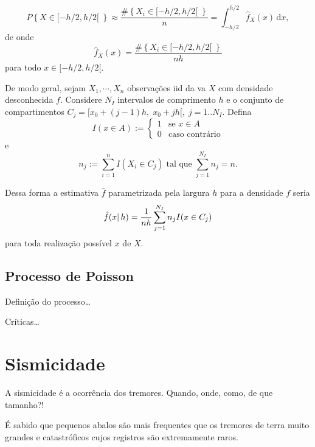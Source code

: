 \begin{equation}
	P \left\{ X \in [-h/2,h/2[ \; \right\} \approx \frac{\# \left\{ X_i \in [-h/2,h/2[ \; \right\}}{n} =
	\int_{-h/2}^{h/2}\!\hat{f}_X(x)\,\mathrm{d}x ,
	\label{eq:hist02}
\end{equation}
de onde 
\begin{equation}
	\hat{f}_X(x) = \frac{\# \left\{ X_i \in [-h/2,h/2[ \; \right\}}{nh}
	\label{eq:hist_03}
\end{equation}
para todo $x \in [-h/2,h/2[$.

De modo geral, sejam $X_1, \cdots, X_n$ observações \gls{iid} da \gls{va} $X$ com densidade desconhecida $f$. 
Considere $N_I$ intervalos de comprimento $h$ e o conjunto de compartimentos $C_j = [x_0 + (j -1)h,\; x_0 + jh[,\;
j=1..N_I$.
Defina
\[
	I(x \in A) := \begin{cases}
		1 & \text{se } x \in A \\
		0 & \text{caso contrário}
	\end{cases}
\] 
e 
\[	n_j := \sum_{i=1}^{n}I(X_i \in C_j)\; \text{tal que} \;  \sum_{j=1}^{N_I}n_j = n. \]

Dessa forma a estimativa $\hat{f}$ parametrizada pela largura $h$ para a densidade $f$ seria
\begin{equation}
	\hat{f}(x \arrowvert\, h) = \frac{1}{nh} \sum_{j=1}^{N_I}n_jI(x \in C_j)
	\label{eq:hist_04}
\end{equation}
para toda realização possível $x$ de $X$.





\subsection{Processo de Poisson}
\label{sec:processo_de_Poisson}

Definição do processo\ldots

Críticas\ldots


 


\section{Sismicidade}
\label{sec:sismicidade}

A sismicidade é a ocorrência dos tremores. Quando, onde, como, de que tamanho?!

É sabido que pequenos abalos são mais frequentes que os tremores de terra
muito grandes e catastróficos cujos registros são extremamente raros.

